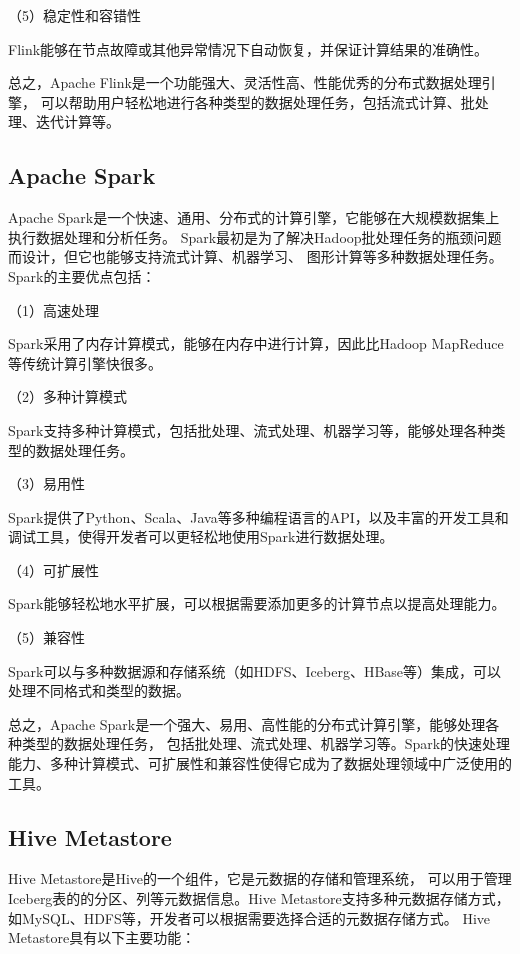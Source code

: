 （5）稳定性和容错性

Flink能够在节点故障或其他异常情况下自动恢复，并保证计算结果的准确性。

总之，Apache Flink是一个功能强大、灵活性高、性能优秀的分布式数据处理引擎，
可以帮助用户轻松地进行各种类型的数据处理任务，包括流式计算、批处理、迭代计算等。

\subsection{Apache Spark}

Apache Spark是一个快速、通用、分布式的计算引擎，它能够在大规模数据集上执行数据处理和分析任务。
Spark最初是为了解决Hadoop批处理任务的瓶颈问题而设计，但它也能够支持流式计算、机器学习、
图形计算等多种数据处理任务\cite{23}。Spark的主要优点包括：

（1）高速处理

Spark采用了内存计算模式，能够在内存中进行计算，因此比Hadoop MapReduce等传统计算引擎快很多。

（2）多种计算模式

Spark支持多种计算模式，包括批处理、流式处理、机器学习等，能够处理各种类型的数据处理任务\cite{43}。

（3）易用性

Spark提供了Python、Scala、Java等多种编程语言的API，以及丰富的开发工具和调试工具，使得开发者可以更轻松地使用Spark进行数据处理。

（4）可扩展性

Spark能够轻松地水平扩展，可以根据需要添加更多的计算节点以提高处理能力。

（5）兼容性

Spark可以与多种数据源和存储系统（如HDFS、Iceberg、HBase等）集成，可以处理不同格式和类型的数据。

总之，Apache Spark是一个强大、易用、高性能的分布式计算引擎，能够处理各种类型的数据处理任务，
包括批处理、流式处理、机器学习等。Spark的快速处理能力、多种计算模式、可扩展性和兼容性使得它成为了数据处理领域中广泛使用的工具。

\subsection{Hive Metastore}

Hive Metastore是Hive的一个组件，它是元数据的存储和管理系统，
可以用于管理Iceberg表的的分区、列等元数据信息。Hive Metastore支持多种元数据存储方式，
如MySQL、HDFS等，开发者可以根据需要选择合适的元数据存储方式\cite{30}。
Hive Metastore具有以下主要功能：

